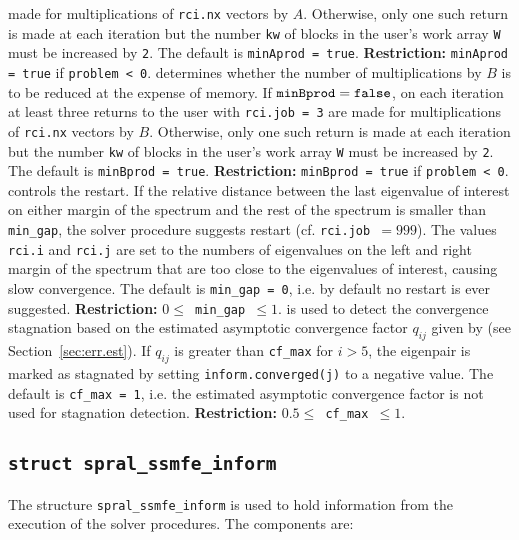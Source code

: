\begin{description}
made for multiplications of {\tt rci.nx} vectors by $A$.
Otherwise,  only one such return is made at each iteration but 
the number {\tt kw} of blocks in the user's work array {\tt W} 
must be increased by {\tt 2}.
The default is {\tt minAprod = true}.
{\bf Restriction:} {\tt minAprod = true} if {\tt problem < 0}.
%
determines whether the number of multiplications by $B$ 
is to be reduced at the expense of memory. 
If ${\tt minBprod = false}$, 
on each iteration at least three returns to the user
with {\tt rci.job = 3} are
made for multiplications of {\tt rci.nx} vectors by $B$.
Otherwise,  only one such return is made at each iteration but 
the number {\tt kw} of blocks in the user's work array {\tt W} 
must be increased by {\tt 2}.
The default is {\tt minBprod = true}.
{\bf Restriction:} {\tt minBprod = true} if {\tt problem < 0}.
%
controls the restart.
If the relative distance between the last eigenvalue of interest
on either margin of the spectrum and the rest of the spectrum
is smaller than {\tt min\_gap},
the solver procedure suggests restart
(cf. {\tt rci.job $= 999$}).
The values 
{\tt rci.i}
and
{\tt rci.j}
are set to the numbers of eigenvalues on the left and right
margin of the spectrum that are too close to the eigenvalues
of interest, causing slow convergence.
The default is {\tt min\_gap = 0}, i.e.
by default no restart is ever suggested.
{\bf Restriction:} {\tt $0 \le$ min\_gap $\le 1$}.
%
is used to detect the convergence stagnation
based on 
the estimated asymptotic convergence factor 
$q_{ij}$ given by 
(see Section~\ref{sec:err.est}).
If $q_{ij}$ is greater than {\tt cf\_max} for $i > 5$,
the eigenpair is marked as stagnated by setting
{\tt inform.converged(j)} to a negative value.
The default is {\tt cf\_max = 1}, i.e.
the estimated asymptotic convergence factor
is not used for stagnation detection.
{\bf Restriction:} {\tt $0.5 \le$ cf\_max $\le 1$}.
%
\end{description}

\subsection{\texttt{struct spral\_ssmfe\_inform}} \label{ssmfe:type:inform}

The structure {\tt spral\_ssmfe\_inform} is used
to hold information from the execution of
the solver procedures.
The components are:

